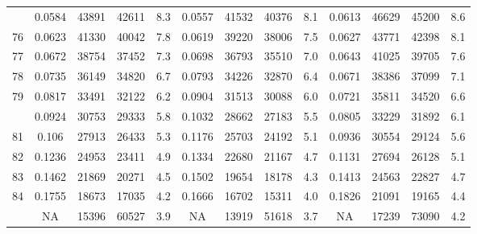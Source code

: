 \documentclass[
  14pt,
]{article}
\begin{document}
\begin{longtable}[t]{lcccccccccccc}
\addlinespace
75 & 0.0584 & 43891 & 42611 & 8.3 & 0.0557 & 41532 & 40376 & 8.1 & 0.0613 & 46629 & 45200 & 8.6\\
76 & 0.0623 & 41330 & 40042 & 7.8 & 0.0619 & 39220 & 38006 & 7.5 & 0.0627 & 43771 & 42398 & 8.1\\
77 & 0.0672 & 38754 & 37452 & 7.3 & 0.0698 & 36793 & 35510 & 7.0 & 0.0643 & 41025 & 39705 & 7.6\\
78 & 0.0735 & 36149 & 34820 & 6.7 & 0.0793 & 34226 & 32870 & 6.4 & 0.0671 & 38386 & 37099 & 7.1\\
79 & 0.0817 & 33491 & 32122 & 6.2 & 0.0904 & 31513 & 30088 & 6.0 & 0.0721 & 35811 & 34520 & 6.6\\
\addlinespace
80 & 0.0924 & 30753 & 29333 & 5.8 & 0.1032 & 28662 & 27183 & 5.5 & 0.0805 & 33229 & 31892 & 6.1\\
81 & 0.106 & 27913 & 26433 & 5.3 & 0.1176 & 25703 & 24192 & 5.1 & 0.0936 & 30554 & 29124 & 5.6\\
82 & 0.1236 & 24953 & 23411 & 4.9 & 0.1334 & 22680 & 21167 & 4.7 & 0.1131 & 27694 & 26128 & 5.1\\
83 & 0.1462 & 21869 & 20271 & 4.5 & 0.1502 & 19654 & 18178 & 4.3 & 0.1413 & 24563 & 22827 & 4.7\\
84 & 0.1755 & 18673 & 17035 & 4.2 & 0.1666 & 16702 & 15311 & 4.0 & 0.1826 & 21091 & 19165 & 4.4\\
\addlinespace
85 & NA & 15396 & 60527 & 3.9 & NA & 13919 & 51618 & 3.7 & NA & 17239 & 73090 & 4.2\\*
\end{longtable}
\end{document}
